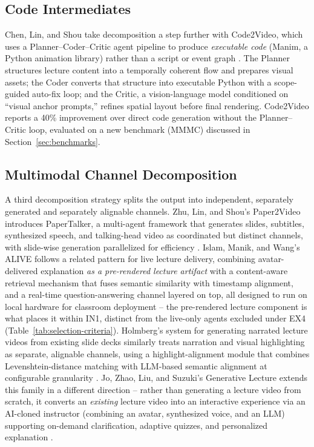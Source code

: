 \documentclass[journal]{IEEEtran}
\begin{document}
\subsection{Code Intermediates}

Chen, Lin, and Shou take decomposition a step further with Code2Video, which uses a Planner--Coder--Critic agent pipeline to produce \emph{executable code} (Manim, a Python animation library) rather than a script or event graph \cite{chen2025code2video}. The Planner structures lecture content into a temporally coherent flow and prepares visual assets; the Coder converts that structure into executable Python with a scope-guided auto-fix loop; and the Critic, a vision-language model conditioned on ``visual anchor prompts,'' refines spatial layout before final rendering. Code2Video reports a 40\% improvement over direct code generation without the Planner--Critic loop, evaluated on a new benchmark (MMMC) discussed in Section~\ref{sec:benchmarks}.

\subsection{Multimodal Channel Decomposition}

A third decomposition strategy splits the output into independent, separately generated and separately alignable channels. Zhu, Lin, and Shou's Paper2Video introduces PaperTalker, a multi-agent framework that generates slides, subtitles, synthesized speech, and talking-head video as coordinated but distinct channels, with slide-wise generation parallelized for efficiency \cite{zhu2025paper2video}. Islam, Manik, and Wang's ALIVE follows a related pattern for live lecture delivery, combining avatar-delivered explanation \emph{as a pre-rendered lecture artifact} with a content-aware retrieval mechanism that fuses semantic similarity with timestamp alignment, and a real-time question-answering channel layered on top, all designed to run on local hardware for classroom deployment \cite{islam2025alive} -- the pre-rendered lecture component is what places it within IN1, distinct from the live-only agents excluded under EX4 (Table~\ref{tab:selection-criteria}). Holmberg's system for generating narrated lecture videos from existing slide decks similarly treats narration and visual highlighting as separate, alignable channels, using a highlight-alignment module that combines Levenshtein-distance matching with LLM-based semantic alignment at configurable granularity \cite{holmberg2025lectures}. Jo, Zhao, Liu, and Suzuki's Generative Lecture extends this family in a different direction -- rather than generating a lecture video from scratch, it converts an \emph{existing} lecture video into an interactive experience via an AI-cloned instructor (combining an avatar, synthesized voice, and an LLM) supporting on-demand clarification, adaptive quizzes, and personalized explanation \cite{jo2025generativelecture}.
\end{document}
